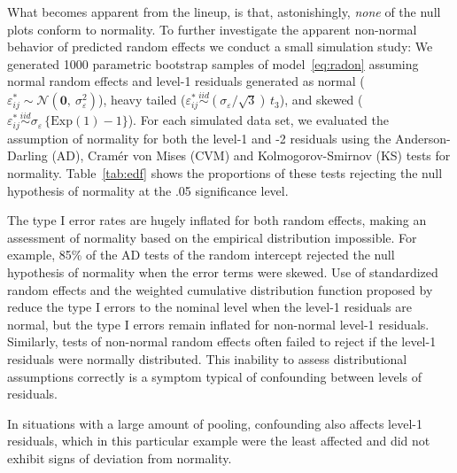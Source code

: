 \documentclass[12pt]{article} %
\begin{document}
What becomes apparent from the lineup, is that, astonishingly, {\it none} of the null plots conform to normality. To further investigate the apparent non-normal behavior of predicted random effects we conduct a small simulation study: 
%
We generated 1000 parametric bootstrap samples of model~\eqref{eq:radon} assuming normal random effects and level-1 residuals generated as normal ($\varepsilon_{ij}^* \sim \mathcal{N}(\bm{0},\ \sigma^2_\varepsilon)$), heavy tailed ($\varepsilon_{ij}^* \overset{iid}{\sim} (\sigma_{\varepsilon} / \sqrt{3})\, t_3$), and skewed ($\varepsilon_{ij}^* \overset{iid}{\sim} \sigma_{\varepsilon} \, \{ \text{Exp}(1) - 1 \}$).
For each simulated data set, we evaluated the assumption of normality for both the level-1 and -2 residuals using the Anderson-Darling (AD), Cram{\'e}r von Mises (CVM) and  Kolmogorov-Smirnov (KS) tests for normality.  
Table~\ref{tab:edf} shows the proportions of these tests rejecting the null hypothesis of normality at the .05 significance level. 

The type I error rates are hugely inflated for both random effects, making an assessment of normality based on the empirical distribution impossible. 
For example, 85\% of the AD tests of the random intercept rejected the null hypothesis of normality when the error terms were skewed.
 Use of standardized random effects and the weighted cumulative distribution function proposed by \cite{Lange:1989uu} reduce the type I errors to the nominal level when the level-1 residuals are normal, but the type I errors remain inflated for non-normal level-1 residuals. 
Similarly, tests of non-normal random effects often failed to reject if the level-1 residuals were normally distributed. 
This inability to assess distributional assumptions correctly is a symptom typical of confounding between levels of residuals.

In situations with a large amount of pooling, confounding also affects level-1 residuals, which in this particular example were the least affected and did not exhibit signs of deviation from normality.
\end{document}
